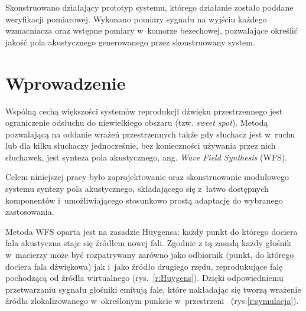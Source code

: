 \documentclass[10pt, a4paper]{article}
\let\Oldsection\section
\renewcommand{\section}{\FloatBarrier\Oldsection}
\begin{document}
Skonstruowano działający prototyp systemu, którego działanie zostało poddane weryfikacji pomiarowej. Wykonano pomiary sygnału na wyjściu każdego wzmacniacza oraz wstępne pomiary w~komorze bezechowej, pozwalające określić jakość pola akustycznego generowanego przez skonstruowany system.

\section{Wprowadzenie}

Wspólną cechą większości systemów reprodukcji dźwięku przestrzennego jest 
ograniczenie odsłuchu do niewielkiego obszaru (tzw. \textit{sweet spot}).
Metodą pozwalającą na oddanie wrażeń przestrzennych także gdy słuchacz jest 
w~ruchu lub dla kilku słuchaczy jednocześnie, bez konieczności używania przez
nich słuchawek, jest synteza pola akustycznego, ang. \textit{Wave Field Synthesis}
(WFS).

Celem niniejszej pracy było zaprojektowanie oraz skonstruowanie modułowego systemu
syntezy pola akustycznego, składającego się z~łatwo dostępnych komponentów
\linebreak i~umożliwiającego stosunkowo prostą adaptację do wybranego zastosowania.

Metoda WFS oparta jest na zasadzie Huygensa: każdy punkt do którego dociera
fala akustyczna staje się źródłem nowej fali. Zgodnie z tą zasadą każdy głośnik
w~macierzy może być rozpatrywany zarówno jako odbiornik (punkt, do którego
dociera fala dźwiękowa) jak i~jako źródło drugiego rzędu, reprodukujące falę
pochodzącą od źródła wirtualnego (rys.~\ref{r:Huygens}). Dzięki
odpowiedniemu przetwarzaniu sygnału głośniki emitują fale, które nakładając
się tworzą wrażenie źródła zlokalizowanego w~określonym punkcie w~przestrzeni~\cite{hq_rendering} (rys.\ref{r:symulacja}).
\end{document}

